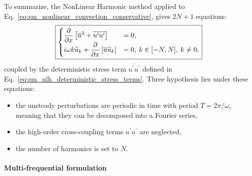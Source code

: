 To summarize, the NonLinear Harmonic
method applied to Eq.~\ref{eq:sm_nonlinear_convection_conservative},
gives $2N + 1$ equations:
\begin{equation}
	\fbox{$
	\begin{cases}
		\displaystyle 
		\frac{\partial}{\partial x}
			\left[\overline{u}^2 + 
			\overline{u^\prime u^\prime}\right] &=
			0, \\
		\displaystyle
		i \omega k \widehat{u}_k + 
			\frac{\partial}{\partial x} 
			\left[ \overline{u} \widehat{u}_k\right] &= 
			0, \: k \in [-N, N], \: k \neq 0,
	\end{cases}
	$}
	\label{eq:sm_nlh_subset_eq}
\end{equation}
coupled by the deterministic stress term $\overline{u^\prime u^\prime}$
defined in Eq.~\ref{eq:sm_nlh_deterministic_stress_terms}.
Three hypothesis lies under these equations:
\begin{itemize}
	\item the unsteady perturbations are periodic in time
	with period $T= 2 \pi / \omega$, 
	meaning that they can be decomposed into a Fourier series,
	\item the high-order cross-coupling terms $u^\prime u^\prime$
	are neglected,
	\item the number of harmonics is set to $N$.
\end{itemize}

\paragraph{Multi-frequential formulation}

